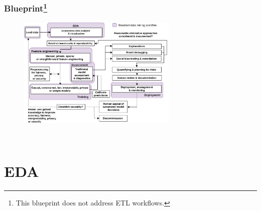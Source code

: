 \documentclass[11pt,
               aspectratio=169,
               hyperref={colorlinks}
               ]{beamer}
\begin{document}
		\begin{frame}				
		
			\frametitle{Blueprint\footnote{\tiny{This blueprint does not address ETL workflows.}}}
							
			\begin{figure}[htb]
				\begin{center}
					\includegraphics[height=150pt]{img/blueprint.png}
					\label{fig:blueprint}
				\end{center}
			\end{figure}		
		
			\centering \
		
		\end{frame}

	\section{EDA}
	
\end{document}
